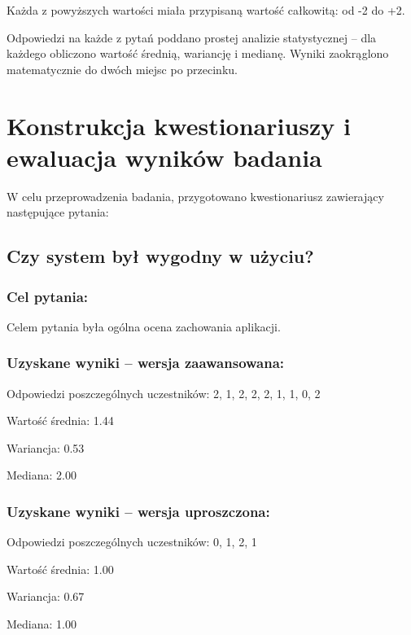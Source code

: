 Każda z powyższych wartości miała przypisaną wartość całkowitą: od -2 do +2.

Odpowiedzi na każde z pytań poddano prostej analizie statystycznej -- dla każdego obliczono wartość średnią, wariancję i medianę. Wyniki zaokrąglono matematycznie do dwóch miejsc po przecinku.

\clearpage


\section{Konstrukcja kwestionariuszy i ewaluacja wyników badania}
\label{sec:konstrukcjaKwestionariuszyIEwaluacjaWynikowBadania}

W celu przeprowadzenia badania, przygotowano kwestionariusz zawierający następujące pytania:

\subsection{Czy system był wygodny w użyciu?}

	\subsubsection{Cel pytania:}
	
	Celem pytania była ogólna ocena zachowania aplikacji.
	
	\subsubsection{Uzyskane wyniki -- wersja zaawansowana:}
	
	Odpowiedzi poszczególnych uczestników: 2, 1, 2, 2, 2, 1, 1, 0, 2
	
	Wartość średnia: 1.44

	Wariancja: 0.53

	Mediana: 2.00
	
	\subsubsection{Uzyskane wyniki -- wersja uproszczona:}
	
	Odpowiedzi poszczególnych uczestników: 0, 1, 2, 1
	
	Wartość średnia: 1.00
	
	Wariancja: 0.67
	
	Mediana: 1.00
	
